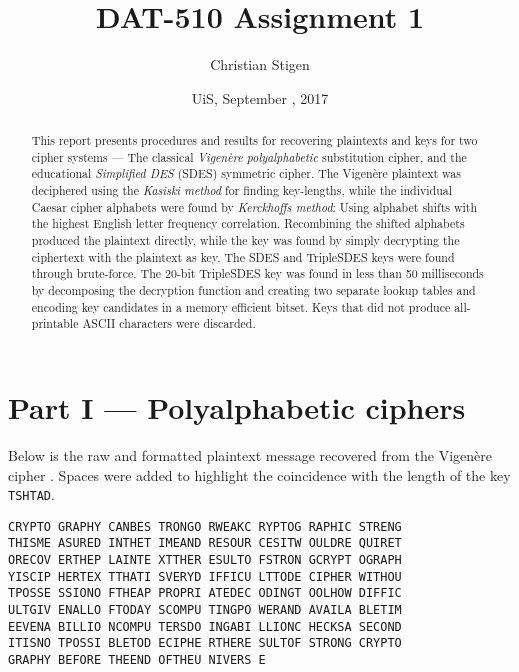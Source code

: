 \documentclass[a4paper,english,12pt]{article}
\title{DAT-510 Assignment 1}
\author{Christian Stigen}
\date{UiS, September \nth{18}, 2017}
\begin{document}
\maketitle


\begin{abstract}
  This report presents procedures and results for recovering plaintexts and keys
  for two cipher systems --- The classical \textit{Vigenère polyalphabetic}
  substitution cipher, and the educational \textit{Simplified DES} (SDES) symmetric cipher.
%
  The Vigenère plaintext was deciphered using the \textit{Kasiski method} for
  finding key-lengths, while the individual Caesar cipher alphabets were found
  by \textit{Kerckhoffs method}: Using alphabet shifts with the highest English
  letter frequency correlation. Recombining the shifted alphabets produced the
  plaintext directly, while the key was found by simply decrypting the
  ciphertext with the plaintext as key.
%
  The SDES and TripleSDES keys were found through brute-force. The 20-bit
  TripleSDES key was found in less than 50 milliseconds by decomposing the
  decryption function and creating two separate lookup tables and encoding key
  candidates in a memory efficient bitset. Keys that did not produce
  all-printable ASCII characters were discarded.
\end{abstract}

\section{Part I --- Polyalphabetic ciphers}

Below is the raw and formatted plaintext message recovered from the Vigenère
cipher \cite{wiki:vigenere, wiki:polyalphabetic}. Spaces were added to highlight
the coincidence with the length of the key \texttt{TSHTAD}.

\begin{verbatim}
CRYPTO GRAPHY CANBES TRONGO RWEAKC RYPTOG RAPHIC STRENG
THISME ASURED INTHET IMEAND RESOUR CESITW OULDRE QUIRET
ORECOV ERTHEP LAINTE XTTHER ESULTO FSTRON GCRYPT OGRAPH
YISCIP HERTEX TTHATI SVERYD IFFICU LTTODE CIPHER WITHOU
TPOSSE SSIONO FTHEAP PROPRI ATEDEC ODINGT OOLHOW DIFFIC
ULTGIV ENALLO FTODAY SCOMPU TINGPO WERAND AVAILA BLETIM
EEVENA BILLIO NCOMPU TERSDO INGABI LLIONC HECKSA SECOND
ITISNO TPOSSI BLETOD ECIPHE RTHERE SULTOF STRONG CRYPTO
GRAPHY BEFORE THEEND OFTHEU NIVERS E
\end{verbatim}
\end{document}
